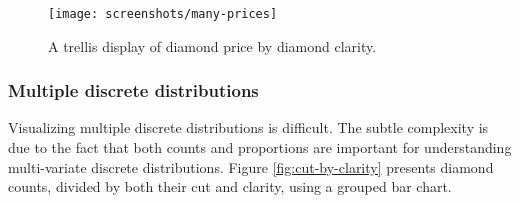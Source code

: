 \documentclass[12pt,]{isuthesis}
\newenvironment{Shaded}{\begin{snugshade}}{\end{snugshade}}
\newcommand{\KeywordTok}[1]{\textcolor[rgb]{0.13,0.29,0.53}{\textbf{{#1}}}}
\newcommand{\DataTypeTok}[1]{\textcolor[rgb]{0.13,0.29,0.53}{{#1}}}
\newcommand{\DecValTok}[1]{\textcolor[rgb]{0.00,0.00,0.81}{{#1}}}
\newcommand{\FloatTok}[1]{\textcolor[rgb]{0.00,0.00,0.81}{{#1}}}
\newcommand{\StringTok}[1]{\textcolor[rgb]{0.31,0.60,0.02}{{#1}}}
\newcommand{\OtherTok}[1]{\textcolor[rgb]{0.56,0.35,0.01}{{#1}}}
\newcommand{\NormalTok}[1]{{#1}}
\begin{document}
\begin{Shaded}
\end{Shaded}

\begin{figure}
\centering
\texttt{[image: screenshots/many-prices]}
\caption{\label{fig:many-prices}A trellis display of diamond price by
diamond clarity.}
\end{figure}

\hypertarget{multiple-discrete-distributions}{\subsubsection{Multiple
discrete distributions}\label{multiple-discrete-distributions}}

Visualizing multiple discrete distributions is difficult. The subtle
complexity is due to the fact that both counts and proportions are
important for understanding multi-variate discrete distributions. Figure
\ref{fig:cut-by-clarity} presents diamond counts, divided by both their
cut and clarity, using a grouped bar chart.

\begin{Shaded}
\end{Shaded}
\end{document}
